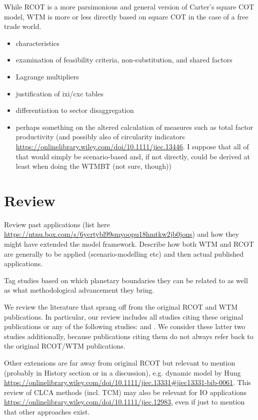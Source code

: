 \documentclass{article}
\begin{document}
\begin{refsection}
While RCOT is a more parsimonious and general version of Carter's square COT model, WTM is more or less directly based on square COT in the case of a free trade world.


\begin{itemize}
    \item characteristics
    \item examination of feasibility criteria, non-substitution, and shared factors
    \item Lagrange multipliers
    \item justification of ixi/cxc tables
    \item differentiation to sector disaggregation
    \item perhaps something on the altered calculation of measures such as total factor productivity (and possibly also of circularity indicators \url{https://onlinelibrary.wiley.com/doi/10.1111/jiec.13446}. I suppose that all of that would simply be scenario-based and, if not directly, could be derived at least when doing the WTMBT (not sure, though))
\end{itemize}

\section{Review}

Review past applications (list here \url{https://ntnu.box.com/s/6ycrtybl99smyoopu18hmtkw2jb0jons}) and how they might have extended the model framework. Describe how both WTM and RCOT are generally to be applied (scenario-modelling etc) and then actual published applications.

Tag studies based on which planetary boundaries they can be related to as well as what methodological advancement they bring.

We review the literature that sprang off from the original RCOT and WTM publications. In particular, our review includes all studies citing these original publications or any of the following studies: \textcite{stromman_2006} and \textcite{kätelhön_2016}. We consider these latter two studies additionally, because publications citing them do not always refer back to the original RCOT/WTM publications.

Other extensions are far away from original RCOT but relevant to mention (probably in History section or in a discussion), e.g. dynamic model by Hung \url{https://onlinelibrary.wiley.com/doi/10.1111/jiec.13331#jiec13331-bib-0061}. This review of CLCA methods (incl. TCM) may also be relevant for IO applications \url{https://onlinelibrary.wiley.com/doi/10.1111/jiec.12983}, even if just to mention that other approaches exist.


\end{refsection}
\end{document}
